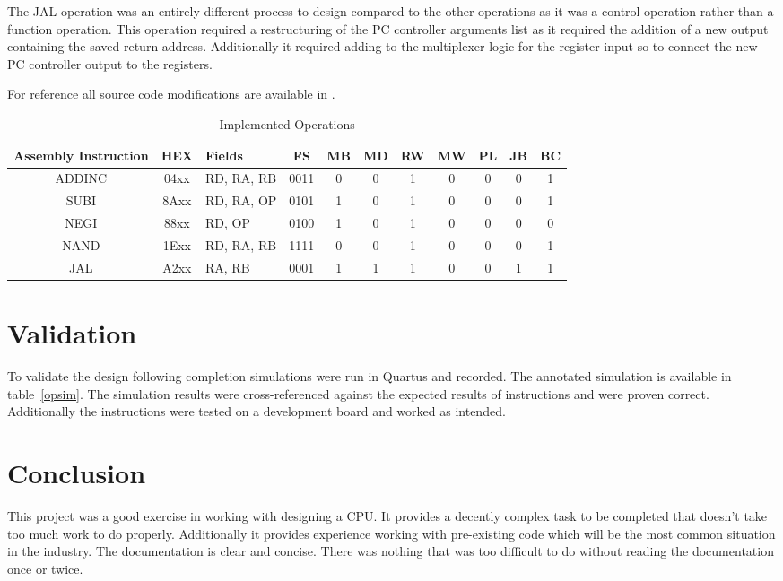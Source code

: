\documentclass[12pt,letterpaper,titlepage]{article}
\begin{document}
\begin{raggedright}
The JAL operation was an entirely different process to design compared to the other operations as it was a control operation rather than a function operation. This operation required a restructuring of the PC controller arguments list as it required the addition of a new output containing the saved return address. Additionally it required adding to the multiplexer logic for the register input so to connect the new PC controller output to the registers.  

For reference all source code modifications are available in .

\begin{table}[ht]
\centering
\def\arraystretch{1.15}
\begin{tabular}{|c|c|l|c|c|c|c|c|c|c|c|} \hline 
Assembly Instruction & HEX  & Fields     & FS   & MB & MD & RW & MW & PL & JB & BC \\ \hline\hline
ADDINC               & 04xx & RD, RA, RB & 0011 & 0  & 0  & 1  & 0  & 0  & 0  & 1  \\ \hline
SUBI                 & 8Axx & RD, RA, OP & 0101 & 1  & 0  & 1  & 0  & 0  & 0  & 1  \\ \hline
NEGI                 & 88xx & RD, OP     & 0100 & 1  & 0  & 1  & 0  & 0  & 0  & 0  \\ \hline
NAND                 & 1Exx & RD, RA, RB & 1111 & 0  & 0  & 1  & 0  & 0  & 0  & 1  \\ \hline
JAL                  & A2xx & RA, RB     & 0001 & 1  & 1  & 1  & 0  & 0  & 1  & 1  \\ \hline
\end{tabular} 
\caption{Implemented Operations}\label{step2}
\end{table}

\clearpage

\section{Validation}

To validate the design following completion simulations were run in Quartus and recorded. The annotated simulation is available in  table~\ref{opsim}. The simulation results were cross-referenced against the expected results of instructions and were proven correct. Additionally the instructions were tested on a development board and worked as intended.

\section{Conclusion}
This project was a good exercise in working with designing a CPU. It provides a decently complex task to be completed that doesn't take too much work to do properly. Additionally it provides experience working with pre-existing code which will be the most common situation in the industry. The documentation is clear and concise. There was nothing that was too difficult to do without reading the documentation once or twice.


\end{raggedright}
\end{document}
